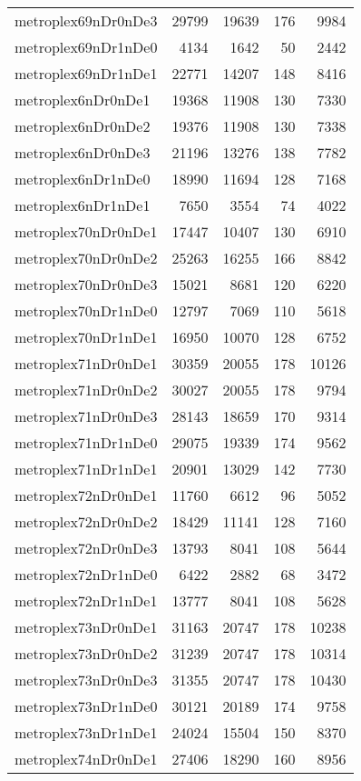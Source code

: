 \begin{longtable}{lrrrr}
metroplex69nDr0nDe3 & 29799 & 19639 & 176 & 9984 \\
metroplex69nDr1nDe0 & 4134 & 1642 & 50 & 2442 \\
metroplex69nDr1nDe1 & 22771 & 14207 & 148 & 8416 \\
metroplex6nDr0nDe1 & 19368 & 11908 & 130 & 7330 \\
metroplex6nDr0nDe2 & 19376 & 11908 & 130 & 7338 \\
metroplex6nDr0nDe3 & 21196 & 13276 & 138 & 7782 \\
metroplex6nDr1nDe0 & 18990 & 11694 & 128 & 7168 \\
metroplex6nDr1nDe1 & 7650 & 3554 & 74 & 4022 \\
metroplex70nDr0nDe1 & 17447 & 10407 & 130 & 6910 \\
metroplex70nDr0nDe2 & 25263 & 16255 & 166 & 8842 \\
metroplex70nDr0nDe3 & 15021 & 8681 & 120 & 6220 \\
metroplex70nDr1nDe0 & 12797 & 7069 & 110 & 5618 \\
metroplex70nDr1nDe1 & 16950 & 10070 & 128 & 6752 \\
metroplex71nDr0nDe1 & 30359 & 20055 & 178 & 10126 \\
metroplex71nDr0nDe2 & 30027 & 20055 & 178 & 9794 \\
metroplex71nDr0nDe3 & 28143 & 18659 & 170 & 9314 \\
metroplex71nDr1nDe0 & 29075 & 19339 & 174 & 9562 \\
metroplex71nDr1nDe1 & 20901 & 13029 & 142 & 7730 \\
metroplex72nDr0nDe1 & 11760 & 6612 & 96 & 5052 \\
metroplex72nDr0nDe2 & 18429 & 11141 & 128 & 7160 \\
metroplex72nDr0nDe3 & 13793 & 8041 & 108 & 5644 \\
metroplex72nDr1nDe0 & 6422 & 2882 & 68 & 3472 \\
metroplex72nDr1nDe1 & 13777 & 8041 & 108 & 5628 \\
metroplex73nDr0nDe1 & 31163 & 20747 & 178 & 10238 \\
metroplex73nDr0nDe2 & 31239 & 20747 & 178 & 10314 \\
metroplex73nDr0nDe3 & 31355 & 20747 & 178 & 10430 \\
metroplex73nDr1nDe0 & 30121 & 20189 & 174 & 9758 \\
metroplex73nDr1nDe1 & 24024 & 15504 & 150 & 8370 \\
metroplex74nDr0nDe1 & 27406 & 18290 & 160 & 8956 \\

\end{longtable}
